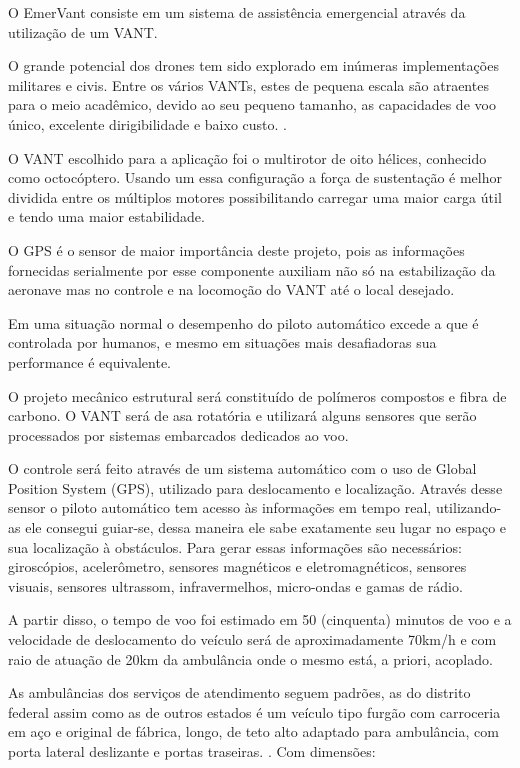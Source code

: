 O EmerVant consiste em um sistema de assistência emergencial através da utilização de um VANT.	

O grande potencial dos drones tem sido explorado em inúmeras implementações militares e civis. Entre os vários VANTs, estes de pequena escala são atraentes para o meio acadêmico, devido ao seu pequeno tamanho, as capacidades de voo único, excelente dirigibilidade e baixo custo. \cite{SDM}.

O VANT escolhido para a aplicação foi o multirotor de oito hélices, conhecido como octocóptero. Usando um essa configuração a força de sustentação é melhor dividida entre os múltiplos motores possibilitando carregar uma maior carga útil e tendo uma maior estabilidade.

O GPS é o sensor de maior importância deste projeto, pois as informações fornecidas serialmente por esse componente auxiliam não só na estabilização da aeronave mas no controle e na locomoção do VANT até o local desejado.

Em uma situação normal o desempenho do piloto automático excede a que é controlada por humanos, e mesmo em situações mais desafiadoras sua performance é equivalente.

O projeto mecânico estrutural será constituído de polímeros compostos e fibra de carbono. O VANT será de asa rotatória e utilizará alguns sensores que serão processados por sistemas embarcados dedicados ao voo. 

O controle será feito através de um sistema automático com o uso de Global Position System (GPS), utilizado para deslocamento e localização. Através desse sensor o piloto automático tem acesso às informações em tempo real, utilizando-as ele consegui guiar-se, dessa maneira ele sabe exatamente seu lugar no espaço e sua localização à obstáculos. Para gerar essas informações são necessários: giroscópios, acelerômetro, sensores magnéticos e eletromagnéticos, sensores visuais, sensores ultrassom, infravermelhos, micro-ondas e gamas de rádio. \cite{UDE}

A partir disso, o tempo de voo foi estimado em 50 (cinquenta) minutos de voo e a velocidade de deslocamento do veículo será de aproximadamente 70km/h e com raio de atuação de 20km da ambulância onde o mesmo está, a priori, acoplado.

As ambulâncias dos serviços de atendimento seguem padrões, as do distrito federal assim como as de outros estados é um veículo tipo furgão com carroceria em aço e original de fábrica, longo, de teto alto adaptado para ambulância, com porta lateral deslizante e portas traseiras. \cite{licitacao}. Com dimensões: 

